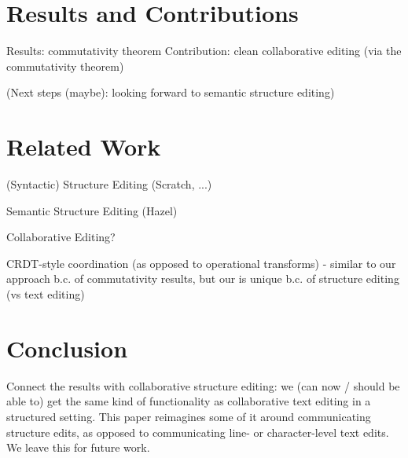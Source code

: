 \documentclass[nonacm, acmsmall, screen, review]{acmart}
\begin{document}

\section{Results and Contributions}

Results: commutativity theorem
Contribution: clean collaborative editing (via the commutativity theorem)

(Next steps (maybe): looking forward to semantic structure editing)


\section{Related Work}

(Syntactic) Structure Editing (Scratch, ...)


Semantic Structure Editing (Hazel)

Collaborative Editing?

CRDT-style coordination (as opposed to operational transforms)
- similar to our approach b.c. of commutativity results, but our is unique b.c. of structure editing (vs text editing)


\section{Conclusion}

Connect the results with collaborative structure editing: we (can now / should be able to) get the same kind of functionality as collaborative text editing in a structured setting. 
This paper reimagines some of it around communicating structure edits, as opposed to communicating line- or character-level text edits.
We leave this for future work.


\end{document}
